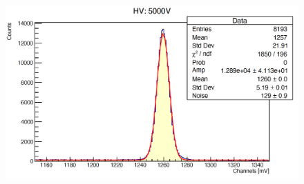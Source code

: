 \documentclass[a4paper,10pt]{article}
\begin{document}
\begin{figure}[H]
    \centering
    \includegraphics[scale=0.45]{appendice/5000}
\end{figure}

\end{document}

